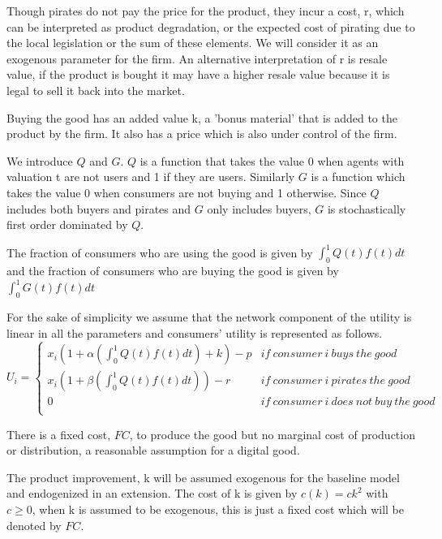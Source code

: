 \documentclass[11pt]{article}
\begin{document}
Though pirates do not pay the price for the product, they incur a cost, r, which can be interpreted as product degradation, or the expected cost of pirating due to the local legislation or the sum of these elements. We will consider it as an exogenous parameter for the firm. An alternative interpretation of r is resale value, if the product is bought it may have a higher resale value because it is legal to sell it back into the market. 

Buying the good has an added value k, a 'bonus material' that is added to the product by the firm. It also has a price which is also under control of the firm.


We introduce $Q$ and $G$. $Q$ is a function that takes the value 0 when agents with valuation t are not users and 1 if they are users. Similarly $G$ is a function which takes the value 0 when consumers are not buying and 1 otherwise. Since $Q$ includes both buyers and pirates and $G$ only includes buyers, $G$ is stochastically first order dominated by $Q$.

The fraction of consumers who are using the good is given by $ \int^{1}_{0}Q(t)f(t)dt$ and the fraction of consumers who are buying the good is given by $ \int^{1}_{0}G(t)f(t)dt$



For the sake of simplicity we assume that the network component of the utility is linear in all the parameters and consumers' utility is represented as follows. 
\[
U_i= \left\{
                \begin{array}{ll}
                  x_i(1+\alpha (\int^{1}_{0}Q(t)f(t)dt) +k ) -p  & if ~ consumer ~ i ~ buys ~ the ~  good  \\
                  x_i(1+\beta (\int^{1}_{0}Q(t)f(t)dt) ) -r &  if ~ consumer ~i ~ pirates ~ the ~  good \\
									0 &  if ~ consumer ~ i ~ does ~ not ~ buy ~ the ~ good   \\
                \end{array}
\right.
\]



There is a fixed cost, $FC$, to produce the good but no marginal cost of production or distribution, a reasonable assumption for a digital good. 

The product improvement, k will be assumed exogenous for the baseline model and endogenized in an extension. The cost of k is given by $c(k)= ck^2$ with $c \geq 0$, when k is assumed to be exogenous, this is just a fixed cost which will be denoted by $FC$.
\end{document}
